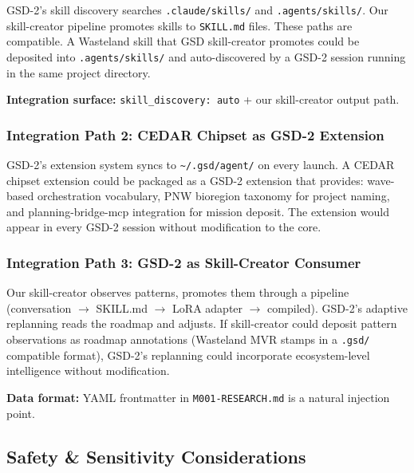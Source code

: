 \documentclass[11pt,letterpaper]{article}
\begin{document}
GSD-2's skill discovery searches \texttt{.claude/skills/} and \texttt{.agents/skills/}. Our skill-creator pipeline promotes skills to \texttt{SKILL.md} files. These paths are compatible. A Wasteland skill that GSD skill-creator promotes could be deposited into \texttt{.agents/skills/} and auto-discovered by a GSD-2 session running in the same project directory.

\textbf{Integration surface:} \texttt{skill\_discovery: auto} + our skill-creator output path.

\subsubsection{Integration Path 2: CEDAR Chipset as GSD-2 Extension}

GSD-2's extension system syncs to \texttt{\textasciitilde/.gsd/agent/} on every launch. A CEDAR chipset extension could be packaged as a GSD-2 extension that provides: wave-based orchestration vocabulary, PNW bioregion taxonomy for project naming, and planning-bridge-mcp integration for mission deposit. The extension would appear in every GSD-2 session without modification to the core.

\subsubsection{Integration Path 3: GSD-2 as Skill-Creator Consumer}

Our skill-creator observes patterns, promotes them through a pipeline (conversation $\rightarrow$ SKILL.md $\rightarrow$ LoRA adapter $\rightarrow$ compiled). GSD-2's adaptive replanning reads the roadmap and adjusts. If skill-creator could deposit pattern observations as roadmap annotations (Wasteland MVR stamps in a \texttt{.gsd/} compatible format), GSD-2's replanning could incorporate ecosystem-level intelligence without modification.

\textbf{Data format:} YAML frontmatter in \texttt{M001-RESEARCH.md} is a natural injection point.

\subsection{Safety \& Sensitivity Considerations}
\end{document}
